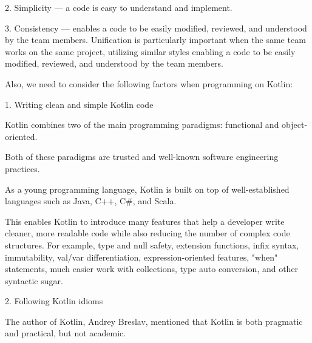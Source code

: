 {{{{





































2.	Simplicity — a code is easy to understand and implement.

3.	Consistency — enables a code to be easily modified, reviewed, and understood by the team members. Unification is particularly important when the same team works on the same project, utilizing similar styles enabling a code to be easily modified, reviewed, and understood by the team members.



Also, we need to consider the following factors when programming on Kotlin:



1. Writing clean and simple Kotlin code



    Kotlin combines two of the main programming paradigms: functional and object-oriented.

    Both of these paradigms are trusted and well-known software engineering practices.

    As a young programming language, Kotlin is built on top of well-established languages such as Java, C++, C\#, and Scala.

    This enables Kotlin to introduce many features that help a developer write cleaner, more readable code while also reducing the number of complex code structures. For example, type and null safety, extension functions, infix syntax, immutability, val/var differentiation, expression-oriented features, "when" statements, much easier work with collections, type auto conversion, and other syntactic sugar.



2. Following Kotlin idioms



    The author of Kotlin, Andrey Breslav, mentioned that Kotlin is both pragmatic and practical, but not academic. 

}}}}
